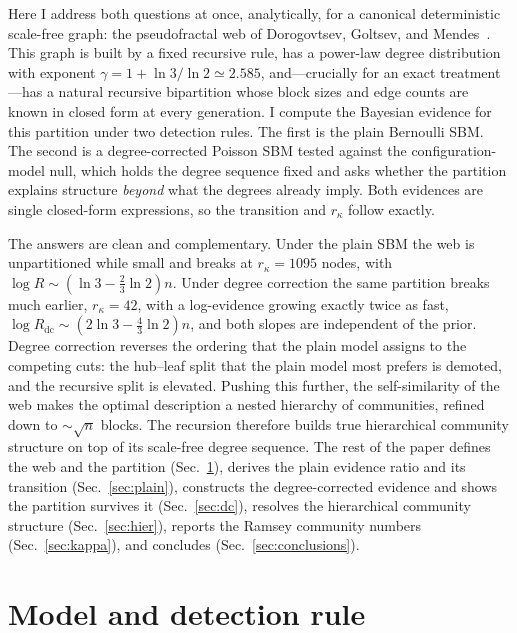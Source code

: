 \documentclass[aps,pre,twocolumn,superscriptaddress,floatfix,nofootinbib]{revtex4-2}
\begin{document}
Here I address both questions at once, analytically, for a canonical
deterministic scale-free graph: the pseudofractal web of Dorogovtsev, Goltsev,
and Mendes~\cite{dorogovtsev2002pseudofractal}. This graph is built by a fixed
recursive rule, has a power-law degree distribution with exponent
$\gamma=1+\ln 3/\ln 2\simeq 2.585$, and---crucially for an exact
treatment---has a natural recursive bipartition whose block sizes and edge
counts are known in closed form at every generation. I compute the Bayesian
evidence for this partition under two detection rules. The first is the plain
Bernoulli SBM. The second is a degree-corrected Poisson
SBM tested against the configuration-model null, which holds the degree
sequence fixed and asks whether the partition explains structure \emph{beyond}
what the degrees already imply. Both evidences are single closed-form
expressions, so the transition and $r_\kappa$ follow exactly.

The answers are clean and complementary. Under the plain SBM the web is
unpartitioned while small and breaks at $r_\kappa=1095$ nodes, with
$\log R\sim(\ln 3-\tfrac23\ln 2)n$. Under degree correction the same partition
breaks much earlier, $r_\kappa=42$, with a log-evidence growing exactly twice as
fast, $\log R_{\mathrm{dc}}\sim(2\ln 3-\tfrac43\ln 2)n$, and both slopes are
independent of the prior. Degree correction reverses the ordering that the
plain model assigns to the competing cuts: the hub--leaf split that the plain
model most prefers is demoted, and the recursive split is elevated. Pushing
this further, the self-similarity of the web makes the optimal description a
nested hierarchy of communities, refined down to $\sim\sqrt{n}$ blocks. The
recursion therefore builds true hierarchical community structure on top of its
scale-free degree sequence. The rest of the paper defines the web and the
partition (Sec.~\ref{sec:model}), derives the plain evidence ratio and its
transition (Sec.~\ref{sec:plain}), constructs the degree-corrected evidence and
shows the partition survives it (Sec.~\ref{sec:dc}), resolves the hierarchical
community structure (Sec.~\ref{sec:hier}), reports the Ramsey community numbers
(Sec.~\ref{sec:kappa}), and concludes (Sec.~\ref{sec:conclusions}).

\section{Model and detection rule}
\label{sec:model}
\end{document}
